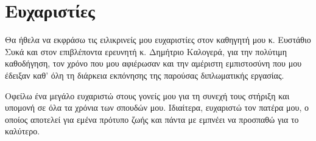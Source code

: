 \chapter*{Ευχαριστίες}
\thispagestyle{plain}
\justifying

Θα ήθελα να εκφράσω τις ειλικρινείς μου ευχαριστίες στον καθηγητή μου κ. Ευστάθιο Συκά και στον επιβλέποντα ερευνητή κ. Δημήτριο Καλογερά, για την πολύτιμη καθοδήγηση, τον χρόνο που μου αφιέρωσαν και την αμέριστη εμπιστοσύνη που μου έδειξαν καθ' όλη τη διάρκεια εκπόνησης της παρούσας διπλωματικής εργασίας. 

Οφείλω ένα μεγάλο ευχαριστώ στους γονείς μου για τη συνεχή τους στήριξη και υπομονή σε όλα τα χρόνια των σπουδών μου.
Ιδιαίτερα, ευχαριστώ τον πατέρα μου, ο οποίος αποτελεί για εμένα πρότυπο ζωής και πάντα με εμπνέει να προσπαθώ για το καλύτερο. 

\blankpage